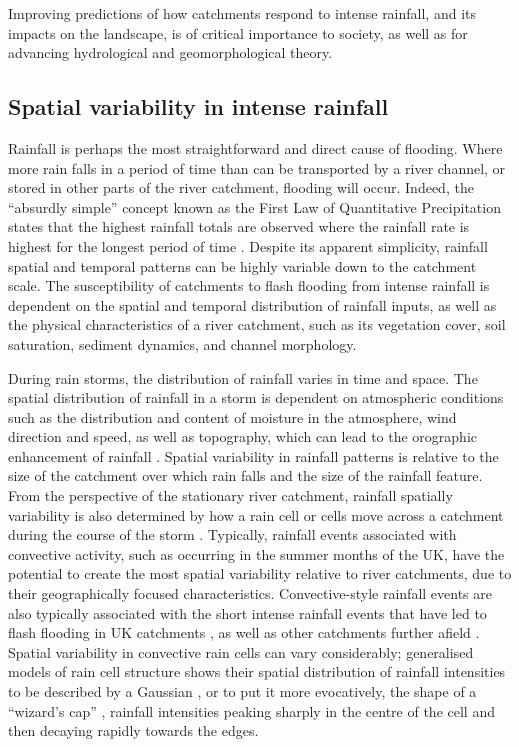 Improving predictions of how catchments respond to intense rainfall, and its impacts on the landscape, is of critical importance to society, as well as for advancing hydrological and geomorphological theory.

\subsection{Spatial variability in intense rainfall}
Rainfall is perhaps the most straightforward and direct cause of flooding. Where more rain falls in a period of time than can be transported  by a river channel, or stored in other parts of the river catchment, flooding will occur. Indeed, the ``absurdly simple'' concept known as the First Law of Quantitative Precipitation states that the highest rainfall totals are observed where the rainfall rate is highest for the longest period of time \citep{Doswell1996}. Despite its apparent simplicity, rainfall spatial and temporal patterns can be highly variable down to the catchment scale. The susceptibility of catchments to flash flooding from intense rainfall is dependent on the spatial and temporal distribution of rainfall inputs, as well as the physical characteristics of a river catchment, such as its vegetation cover, soil saturation, sediment dynamics, and channel morphology.

During rain storms, the distribution of rainfall varies in time and space. The spatial distribution of rainfall in a storm is dependent on atmospheric conditions such as the distribution and content of moisture in the atmosphere, wind direction and speed, as well as topography, which can lead to the orographic enhancement of rainfall \citep{Roe2003,Roe2005a,Houze2012}. Spatial variability in rainfall patterns is relative to the size of the catchment over which rain falls and the size of the rainfall feature. From the perspective of the stationary river catchment, rainfall spatially variability is also determined by how a rain cell or cells move across a  catchment during the course of the storm \citep{willems2001spatial}. Typically, rainfall events associated with convective activity, such as occurring in the summer months of the UK, have the potential to create the most spatial variability relative to river catchments, due to their geographically focused characteristics. Convective-style rainfall events are also typically associated with the short intense rainfall events that have led to flash flooding in UK catchments \citep{gray1998mesoscale,bell2000sensitivity,Browning2007,blackburn2008large,Kendon2014}, as well as other catchments further afield \citep{doswell1993flash,Doswell1996}. Spatial variability in convective rain cells can vary considerably; generalised models of rain cell structure shows their spatial distribution of rainfall intensities to be described by a Gaussian \citep{luyckx1998influence,willems2001spatial}, or to put it more evocatively, the shape of a ``wizard's cap'' \citep{solyom2007importance}, rainfall intensities peaking sharply in the centre of the cell and then decaying rapidly towards the edges.
 
